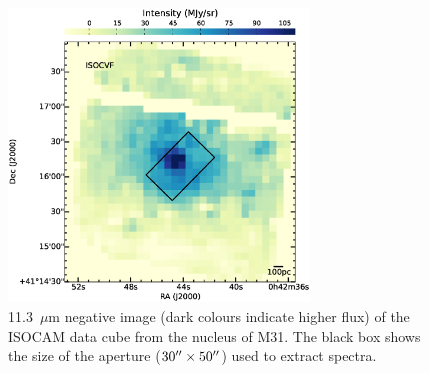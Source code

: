 \begin{figure}
\centering
\includegraphics[width = 8cm]{./fig5.eps}
\caption{11.3~$\mu$m negative image (dark colours indicate higher flux) of the ISOCAM data cube from the nucleus of M31. 
The black box shows the size of the aperture ($30\hbox{$^{\prime\prime}$}\times50\hbox{$^{\prime\prime}$}$) used to extract spectra.}
\label{isonuc}
\end{figure}






